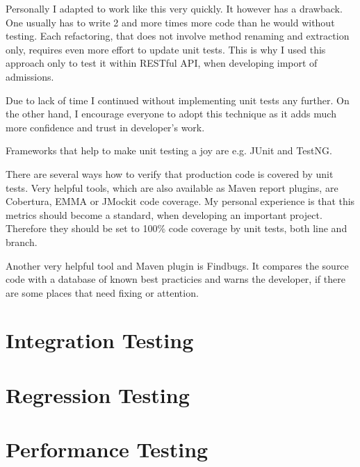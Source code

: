 	Personally I adapted to work like this very quickly. It however has a drawback. One usually has to write 2 and more
	times more code than he would without testing. Each refactoring, that does not involve method renaming and extraction
	only, requires even more effort to update unit tests. This is why I used this approach only to test it within RESTful
	API, when developing import of admissions.
	
	Due to lack of time I continued without implementing unit tests any further. On the other hand, I encourage everyone to
	adopt this technique as it adds much more confidence and trust in developer's work.

	Frameworks that help to make unit testing a joy are e.g. JUnit and TestNG.
	
	There are several ways how to verify that production code is covered by unit tests. Very helpful tools, which are
	also available as Maven report plugins, are Cobertura, EMMA or JMockit code coverage. My personal experience is that
	this metrics should become a standard, when developing an important project. Therefore they should be set to
	100\% code coverage by unit tests, both line and branch.
	
	Another very helpful tool and Maven plugin is Findbugs. It compares the source code with a database of known best
	practicies and warns the developer, if there are some places that need fixing or attention.

	\section{Integration Testing}

	\section{Regression Testing}

	\section{Performance Testing}